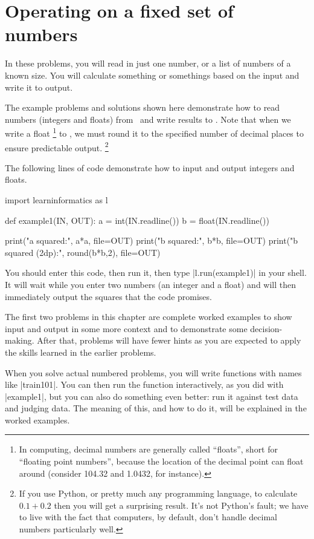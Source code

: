 
\chapter{Operating on a fixed set of numbers}

In these problems, you will read in just one number, or a list of numbers of a known size.
You will calculate something or somethings based on the input and write it to output.

The example problems and solutions shown here demonstrate how to read numbers (integers
and floats) from \IN\ and write results to \OUT. Note that when we write a float%
\footnote{In computing, decimal numbers are generally called ``floats'', short for
    ``floating point numbers'', because the location of the decimal point can float around
    (consider 104.32 and 1.0432, for instance).}
to \OUT, we must round it to the specified number of decimal places to ensure predictable
output.%
\footnote{If you use Python, or pretty much any programming language, to calculate
  $0.1+0.2$ then you will get a surprising result. It's not Python's fault; we have to live
  with the fact that computers, by default, don't handle decimal numbers particularly
well.}

The following lines of code demonstrate how to input and output integers and floats. 

\begin{pythoncode} 
  import learninformatics as l

  def example1(IN, OUT):
    a = int(IN.readline())
    b = float(IN.readline())

    print("a squared:", a*a, file=OUT)
    print("b squared:", b*b, file=OUT)
    print("b squared (2dp):", round(b*b,2), file=OUT)
\end{pythoncode}

You should enter this code, then run it, then type \pycode|l.run(example1)| in your shell.
It will wait while you enter two numbers (an integer and a float) and will then
immediately output the squares that the code promises.

The first two problems in this chapter are complete worked examples to show input and
output in some more context and to demonstrate some decision-making. After that, problems
will have fewer hints as you are expected to apply the skills learned in the earlier
problems.

When you solve actual numbered problems, you will write functions with names like
\pycode|train101|. You can then run the function interactively, as you did with
\pycode|example1|, but you can also do something even better: run it against test data and
judging data. The meaning of this, and how to do it, will be explained in the worked
examples.


